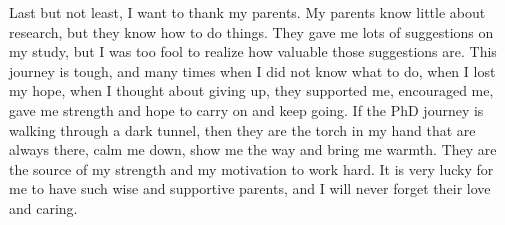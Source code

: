 \begin{acknowledgements}
Last but not least, I want to thank my parents. My parents know little
about research, but they know how to do things. They gave me lots of 
suggestions on my study, but I was too fool to realize how valuable those 
suggestions are. This journey is tough, and many times when I did not
know what to do, when I lost my hope, when I thought about giving up,
they supported me, encouraged me, gave me strength and hope to 
carry on and keep going. If the PhD journey is walking through a dark 
tunnel, then they are the torch in my hand that are always there,
calm me down, show me the way and bring me warmth. They are the source of 
my strength and my motivation to work hard. It is very lucky for me to have 
such wise and supportive parents, and I will never forget their love 
and caring.
\end{acknowledgements}
